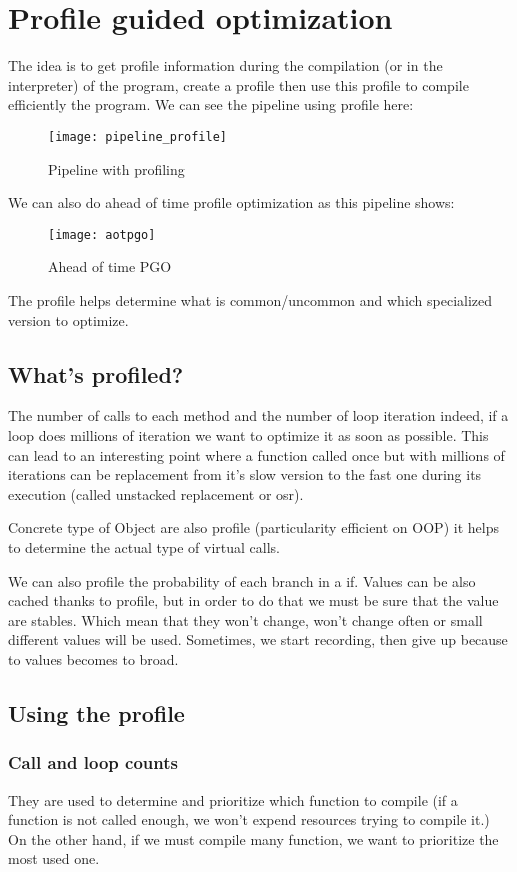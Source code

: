 \chapter{Profile guided optimization}
\label{chap:profile_guided_opti}
The idea is to get profile information during the compilation (or in the
interpreter) of the program, create a profile then use this profile to compile
efficiently the program.
We can see the pipeline using profile here:
\begin{figure}[H]
     \centering
     \texttt{[image: pipeline\_profile]}
     \caption{Pipeline with profiling}
     \label{fig:pipeline_profiling}
\end{figure}
We can also do ahead of time profile optimization as this pipeline shows:
\begin{figure}[H]
     \centering
     \texttt{[image: aotpgo]}
     \caption{Ahead of time PGO}
     \label{fig:pipeline_pgo}
\end{figure}
The profile helps determine what is common/uncommon and which specialized
version to optimize.
\section{What's profiled?}
The number of calls to each method and the number of loop iteration indeed, if a
loop does millions of iteration we want to optimize it as soon as possible. This
can lead to an interesting point where a function called once but with millions
of iterations can be replacement from it's slow version to the fast one during
its execution (called unstacked replacement or osr). 

Concrete type of Object are also profile (particularity efficient on OOP) it
helps to determine the actual type of virtual calls.

We can also profile the probability of each branch in a if. Values can be also
cached thanks to profile, but in order to do that we must be sure that the value
are stables. Which mean that they won't change, won't change often or small
different values will be used. Sometimes, we start recording, then give up
because to values becomes to broad.

\section{Using the profile}
\subsection{Call and loop counts}
They are used to determine and prioritize which function to compile (if a
function is not called enough, we won't expend resources trying to compile it.)
On the other hand, if we must compile many function, we want to prioritize the
most used one.
